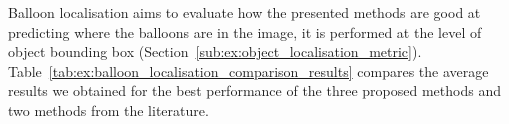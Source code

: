 

Balloon localisation aims to evaluate how the presented methods are good at predicting where the balloons are in the image, it is performed at the level of object bounding box (Section~\ref{sub:ex:object_localisation_metric}).
Table~\ref{tab:ex:balloon_localisation_comparison_results} compares the average results we obtained for the best performance of the three proposed methods and two methods from the literature.



